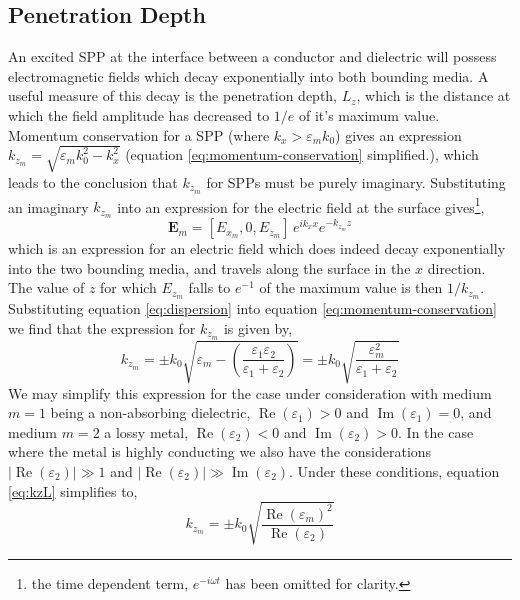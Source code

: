 \subsection{Penetration Depth}

An excited SPP at the interface between a conductor and dielectric will possess electromagnetic fields which decay exponentially into both bounding media. A useful measure of this decay is the penetration depth, $L_z$, which is the distance at which the field amplitude has decreased to $1/e$ of it's maximum value.
Momentum conservation for a SPP (where $k_x>\varepsilon_m k_0$) gives an expression $k_{z_m}=\sqrt{\varepsilon_m k_0^2-k_x^2}$ (equation \ref{eq:momentum-conservation} simplified.), which leads to the conclusion that $k_{z_m}$ for SPPs must be purely imaginary. Substituting an imaginary $k_{z_m}$ into an expression for the electric field at the surface gives\footnote{the time dependent term, $e^{-i \omega t}$ has been omitted for clarity.},
\begin{equation}
\mathbf{E}_m = [E_{x_m},0,E_{z_m}]\,e^{i k_{x}x}e^{-k_{z_m} z}
\end{equation}
which is an expression for an electric field which does indeed decay exponentially into the two bounding media, and travels along the surface in the $x$ direction. The value of $z$ for which $E_{z_m}$ falls to $e^{-1}$ of the maximum value is then $1/k_{z_m}$. Substituting equation \ref{eq:dispersion} into equation \ref{eq:momentum-conservation} we find that the expression for $k_{z_m}$ is given by,
\begin{equation}
k_{z_m}=\pm k_0\sqrt{\varepsilon_m - \left(\frac{\varepsilon_1 \varepsilon_2}{\varepsilon_1+\varepsilon_2}\right)}=\pm k_0 \sqrt{ \frac{\varepsilon_m^2}{\varepsilon_1+\varepsilon_2}}\label{eq:kzL}
\end{equation}
We may simplify this expression for the case under consideration with medium $m=1$ being a non-absorbing dielectric, $\operatorname{Re}(\varepsilon_1)>0$ and $\operatorname{Im}(\varepsilon_1)=0$, and medium $m=2$ a lossy metal, $\operatorname{Re}(\varepsilon_2)<0$  and $\operatorname{Im}(\varepsilon_2)>0$. In the case where the metal is highly conducting we also have the considerations $|\operatorname{Re}(\varepsilon_2)|\gg 1$ and $|\operatorname{Re}(\varepsilon_2)|\gg \operatorname{Im}(\varepsilon_2)$. Under these conditions, equation \ref{eq:kzL} simplifies to,
\begin{equation}
k_{z_m}=\pm k_0 \sqrt{\frac{\operatorname{Re}(\varepsilon_m)^2}{\operatorname{Re}(\varepsilon_2)}}
\end{equation}
